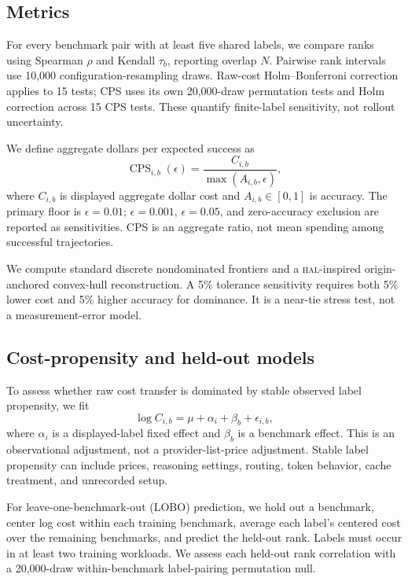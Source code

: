\documentclass[11pt]{article}
\newcommand{\hal}{\textsc{hal}}
\begin{document}
\subsection{Metrics}

For every benchmark pair with at least five shared labels, we compare ranks using Spearman \(\rho\) and Kendall \(\tau_b\), reporting overlap \(N\). Pairwise rank intervals use 10,000 configuration-resampling draws. Raw-cost Holm--Bonferroni correction applies to 15 tests; CPS uses its own 20,000-draw permutation tests and Holm correction across 15 CPS tests. These quantify finite-label sensitivity, not rollout uncertainty.

We define aggregate dollars per expected success as
\[
\operatorname{CPS}_{i,b}(\epsilon)=\frac{C_{i,b}}{\max(A_{i,b},\epsilon)},
\]
where \(C_{i,b}\) is displayed aggregate dollar cost and \(A_{i,b}\in[0,1]\) is accuracy. The primary floor is \(\epsilon=0.01\); \(\epsilon=0.001\), \(\epsilon=0.05\), and zero-accuracy exclusion are reported as sensitivities. CPS is an aggregate ratio, not mean spending among successful trajectories.

We compute standard discrete nondominated frontiers and a \hal-inspired origin-anchored convex-hull reconstruction. A 5\% tolerance sensitivity requires both 5\% lower cost and 5\% higher accuracy for dominance. It is a near-tie stress test, not a measurement-error model.

\subsection{Cost-propensity and held-out models}

To assess whether raw cost transfer is dominated by stable observed label propensity, we fit
\[
\log C_{i,b}=\mu+\alpha_i+\beta_b+\epsilon_{i,b},
\]
where \(\alpha_i\) is a displayed-label fixed effect and \(\beta_b\) is a benchmark effect. This is an observational adjustment, not a provider-list-price adjustment. Stable label propensity can include prices, reasoning settings, routing, token behavior, cache treatment, and unrecorded setup.

For leave-one-benchmark-out (LOBO) prediction, we hold out a benchmark, center log cost within each training benchmark, average each label's centered cost over the remaining benchmarks, and predict the held-out rank. Labels must occur in at least two training workloads. We assess each held-out rank correlation with a 20,000-draw within-benchmark label-pairing permutation null.
\end{document}
